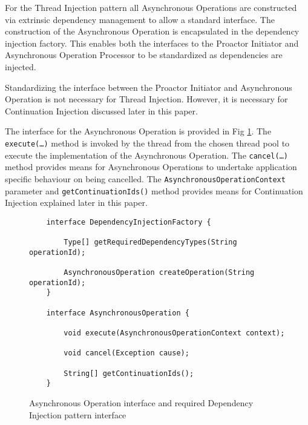 \documentclass[prodmode]{style/acmlarge}
\begin{document}
For the Thread Injection pattern all Asynchronous Operations are constructed via
extrinsic dependency management \cite{ioc} to allow a standard interface.
The construction of the Asynchronous Operation is encapsulated in the dependency
injection factory.  This enables both the interfaces to the Proactor Initiator
and Asynchronous Operation Processor to be standardized as dependencies are
injected.

Standardizing the interface between the Proactor Initiator and Asynchronous
Operation is not necessary for Thread Injection.  However, it is necessary for
Continuation Injection discussed later in this paper.

The interface for the Asynchronous Operation is provided in Fig
\ref{fig:AO_interface_AOP}.  The \texttt{execute(\ldots)} method is invoked by
the thread from the chosen thread pool to execute the implementation of the
Asynchronous Operation.  The \texttt{cancel(\ldots)} method provides means for
Asynchronous Operations to undertake application specific behaviour on being
cancelled.  The \texttt{AsynchronousOperationContext} parameter and
\texttt{getContinuationIds()} method provides means for Continuation Injection
explained later in this paper.

\begin{figure}[tp]
\centering
\begin{verbatim}
    interface DependencyInjectionFactory {
    
        Type[] getRequiredDependencyTypes(String operationId);
        
        AsynchronousOperation createOperation(String operationId);
    }

    interface AsynchronousOperation {
    
        void execute(AsynchronousOperationContext context);
        
        void cancel(Exception cause);
        
        String[] getContinuationIds();
    }
\end{verbatim}
\caption{Asynchronous Operation interface and required Dependency Injection pattern interface\footnotemark}
\label{fig:AO_interface_AOP}
\end{figure}
\end{document}
